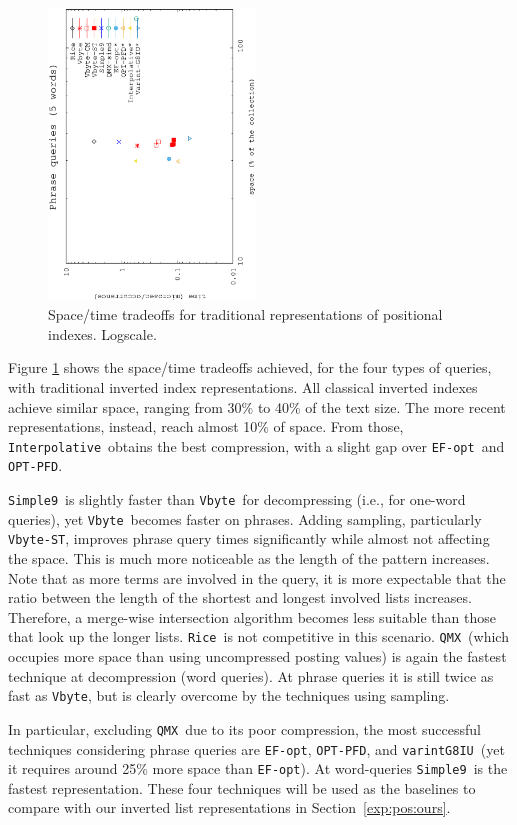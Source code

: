 \documentclass[review]{elsarticle}
\newcommand{\vbyte}{\texttt{Vbyte}}
\newcommand{\rice}{\texttt{Rice}}
\newcommand{\simplen}{\texttt{Simple9}}
\newcommand{\qmx}{\texttt{QMX}}
\newcommand{\vbyteST}{\texttt{Vbyte-ST}}
\newcommand{\interpolative}{\texttt{Interpolative}}
\newcommand{\efopt}{\texttt{EF-opt}}
\newcommand{\optpfd}{\texttt{OPT-PFD}}
\newcommand{\varint}{\texttt{varintG8IU}}
\begin{document}
\begin{figure}[t]
\begin{center}
\includegraphics[angle=-90,width=0.49\textwidth]{../figures/f3/phrases5-5/locate-5_5.eps}
\caption{Space/time tradeoffs for traditional representations of positional indexes. Logscale.}
\label{fig:pos}
\end{center}
\end{figure}

Figure \ref{fig:pos} shows the space/time tradeoffs achieved, for the four
types of queries, with traditional inverted index representations.
All classical inverted indexes achieve similar space, ranging from 30\% to 40\% of the text size. The more recent representations, instead, reach almost 10\%
of space. From those, \interpolative\ obtains the best compression, with a slight gap over \efopt\ and \optpfd. 

\simplen\ is slightly faster than \vbyte\ for decompressing (i.e., 
for one-word queries), yet \vbyte\ becomes faster on phrases.
Adding sampling, particularly \vbyteST, improves phrase query times
significantly while almost not affecting the space. This is much more noticeable as the 
length of the pattern increases. Note that as more terms are involved in the query, it is
more expectable that the ratio between the length of the shortest 
and longest involved lists increases. Therefore, a merge-wise intersection algorithm  becomes 
less suitable than those that look up the longer lists.
\rice\ is not competitive in this scenario. \qmx\ (which occupies more space than using uncompressed posting values) is again the fastest technique at decompression (word queries). At phrase queries it is still twice as fast as \vbyte, but is clearly overcome by the techniques using sampling. 

In particular, excluding \qmx\ due to its poor compression, the most successful techniques considering phrase queries are \efopt, \optpfd,  and \varint\ (yet it requires around 25\% more space than \efopt). At word-queries \simplen\ is the fastest representation. These four techniques will be used as the baselines to compare with our inverted list representations in Section~\ref{exp:pos:ours}.
\end{document}
